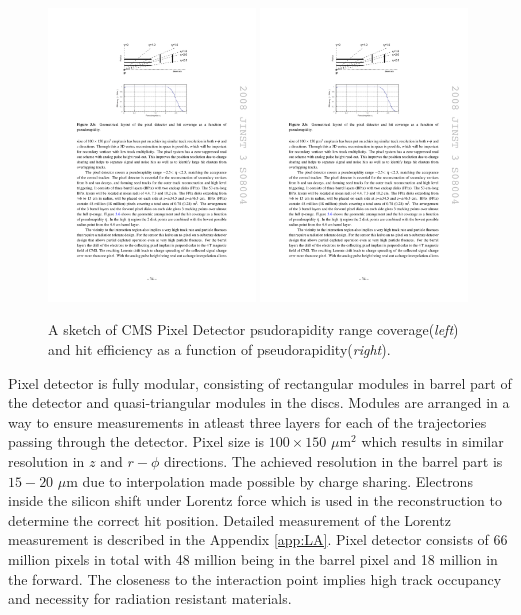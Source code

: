 \begin{figure}[htbp]
	\centering
		\includegraphics[width=0.49\textwidth]{Figures/pixel_eta.pdf}
		\includegraphics[width=0.49\textwidth]{Figures/pixel_eta2.pdf}
	\caption[CMS Pixel Detector psudorapidity range coverage and efficiency]{A sketch of CMS Pixel Detector psudorapidity range coverage(\textit{left}) and hit efficiency as a function of pseudorapidity(\textit{right}). \cite{Chatrchyan:2008aa}}
	\label{fig:pixels_eta}
\end{figure}
\par Pixel detector is fully modular, consisting of rectangular modules in barrel part of the detector and quasi-triangular modules in the discs. Modules are arranged in a way to ensure measurements in atleast three layers for each of the trajectories passing through the detector. Pixel size is $100\times150$ $\mu$m$^2$ which results in similar resolution in $z$ and $r-\phi$ directions. The achieved resolution in the barrel part is $15-20$ $\mu$m due to interpolation made possible by charge sharing. Electrons inside the silicon shift under Lorentz force which is used in the reconstruction to determine the correct hit position. Detailed measurement of the Lorentz measurement is described in the Appendix \ref{app:LA}. Pixel detector consists of 66 million pixels in total with 48 million being in the barrel pixel and 18 million in the forward. The closeness to the interaction point implies high track occupancy and necessity for radiation resistant materials. 
